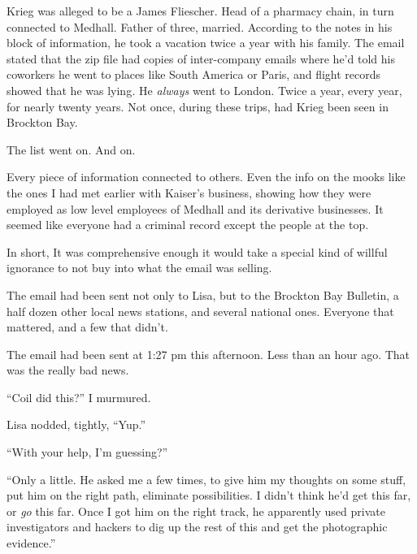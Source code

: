Krieg was alleged to be a James Fliescher.  Head of a pharmacy chain, in turn connected to Medhall.  Father of three, married.  According to the notes in his block of information, he took a vacation twice a year with his family.  The email stated that the zip file had copies of inter-company emails where he'd told his coworkers he went to places like South America or Paris, and flight records showed that he was lying\emph{.  }He\emph{ always} went to London.  Twice a year, every year, for nearly twenty years.  Not once, during these trips, had Krieg been seen in Brockton Bay.



The list went on.  And on.



Every piece of information connected to others.  Even the info on the mooks like the ones I had met earlier with Kaiser's business, showing how they were employed as low level employees of Medhall and its derivative businesses.  It seemed like everyone had a criminal record except the people at the top.



In short, It was comprehensive enough it would take a special kind of willful ignorance to not buy into what the email was selling.



The email had been sent not only to Lisa, but to the Brockton Bay Bulletin, a half dozen other local news stations, and several national ones.  Everyone that mattered, and a few that didn't.



The email had been sent at 1:27 pm this afternoon.  Less than an hour ago.  That was the really bad news.



``Coil did this?''  I murmured.



Lisa nodded, tightly, ``Yup.''



``With your help, I'm guessing?''



``Only a little.  He asked me a few times, to give him my thoughts on some stuff, put him on the right path, eliminate possibilities.  I didn't think he'd get this far, or \emph{go} this far.  Once I got him on the right track, he apparently used private investigators and hackers to dig up the rest of this and get the photographic evidence.''



